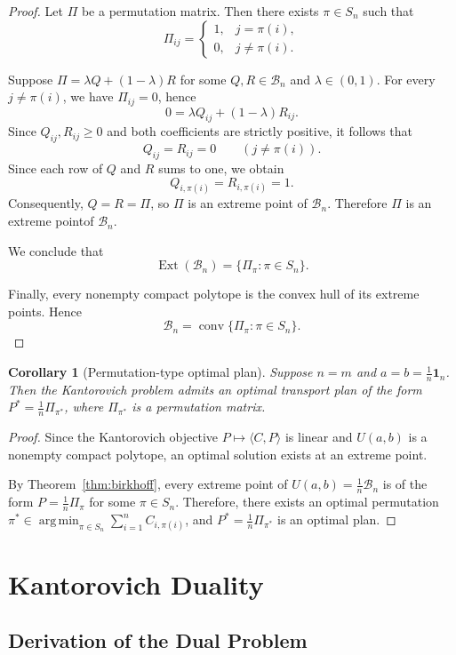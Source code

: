 \documentclass[11pt,a4paper]{article}
\newtheorem{corollary}[theorem]{Corollary}
\theoremstyle{definition}
\begin{document}
\begin{proof}
Let $\Pi$ be a permutation matrix. Then there exists $\pi\in S_n$ such that
\[\Pi_{ij}=
\begin{cases}
1, & j=\pi(i),\\
0, & j\neq\pi(i).
\end{cases}
\]

Suppose $\Pi=\lambda Q+(1-\lambda)R$ for some $Q,R\in\mathcal{B}_n$ and $\lambda\in(0,1)$.
For every $j\neq\pi(i)$, we have $\Pi_{ij}=0$, hence
\[0=\lambda Q_{ij}+(1-\lambda)R_{ij}.\]
Since $Q_{ij},R_{ij}\geq0$ and both coefficients are strictly positive, it follows that
\[Q_{ij}=R_{ij}=0\qquad(j\neq\pi(i)).\]
Since each row of $Q$ and $R$ sums to one, we obtain
\[Q_{i,\pi(i)}=R_{i,\pi(i)}=1.\]
Consequently, $Q=R=\Pi$, so $\Pi$ is an extreme point of $\mathcal{B}_n$.
Therefore $\Pi$ is an extreme pointof $\mathcal{B}_n$.

We conclude that
\[\operatorname{Ext}(\mathcal{B}_n)=\{\Pi_\pi:\pi\in S_n\}.\]

Finally, every nonempty compact polytope is the convex hull of its extreme points. Hence
\[\mathcal{B}_n=\operatorname{conv}\{\Pi_\pi:\pi\in S_n\}.\]
\end{proof}

\begin{corollary}[Permutation-type optimal plan]
\label{cor:permutation-optimal}
Suppose $n=m$ and $a=b=\frac{1}{n}\mathbf{1}_n$.
Then the Kantorovich problem admits an optimal transport plan of the form
$P^*=\frac{1}{n}\Pi_{\pi^*}$, where $\Pi_{\pi^*}$ is a permutation matrix.
\end{corollary}

\begin{proof}
Since the Kantorovich objective $P\longmapsto\langle C,P\rangle$ is linear
and $U(a,b)$ is a nonempty compact polytope, an optimal solution exists
at an extreme point.

By Theorem~\ref{thm:birkhoff}, every extreme point of $U(a,b)=\frac{1}{n}\mathcal{B}_n$
is of the form $P=\frac{1}{n}\Pi_\pi$ for some $\pi\in S_n$. Therefore, there exists
an optimal permutation $\pi^*\in\operatorname*{arg\,min}_{\pi\in S_n}\sum_{i=1}^n C_{i,\pi(i)}$,
and $P^*=\frac{1}{n}\Pi_{\pi^*}$ is an optimal plan.

\end{proof}

\section{Kantorovich Duality}
\subsection{Derivation of the Dual Problem}
\end{document}
